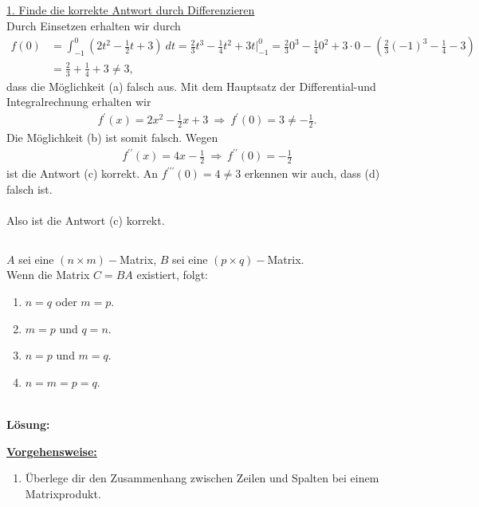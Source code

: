 \underline{1. Finde die korrekte Antwort durch Differenzieren}\\
Durch Einsetzen erhalten wir durch
\begin{align*}
f(0)
&=
\int_{-1}^0 \left( 2 t^2 - \frac{1}{2}t +3 \right) \ dt
=
\frac{2}{3} t^3 - \frac{1}{4} t^2 + 3 t \bigg|_{-1}^0
=
\frac{2}{3} 0^3 - \frac{1}{4} 0^2 + 3 \cdot 0
- (\frac{2}{3} (-1)^3  - \frac{1}{4} - 3 )\\
&=
\frac{2}{3} + \frac{1}{4} + 3  \neq 3,
\end{align*}
dass die Möglichkeit (a) falsch aus. Mit dem Hauptsatz der Differential-und Integralrechnung erhalten wir 
\begin{align*}
f^\prime(x)
 = 2 x^2 - \frac{1}{2} x + 3 
 \ 
  \Rightarrow \
  f^\prime(0)  = 3 \neq -\frac{1}{2}.
\end{align*}
Die Möglichkeit (b) ist somit falsch.
Wegen
\begin{align*}
f^{\prime \prime}(x) = 4 x - \frac{1}{2}
\ \Rightarrow \
f^{\prime \prime}(0) = - \frac{1}{2}
\end{align*}
ist die Antwort (c) korrekt. An $ f^{\prime \prime \prime}(0) = 4 \neq 3 $ erkennen wir auch, dass (d) falsch ist.\\
\\
Also ist die Antwort (c) korrekt.
 \newpage

\subsection*{}
$ A $ sei eine $ (n \times m )- $Matrix, $ B $ sei eine $ (p \times q)- $Matrix.\\
Wenn die Matrix $ C = BA $ existiert, folgt:
\renewcommand{\labelenumi}{(\alph{enumi})}
\begin{enumerate}
	\item 
	$ n= q $ oder $ m = p $.
	\item 
	$ m = p $ und $ q= n $.
	\item
	$ n= p $ und $ m = q $.
	\item
	$ n = m = p = q $.
\end{enumerate}
\ \\
\textbf{Lösung:}
\begin{mdframed}
\underline{\textbf{Vorgehensweise:}}
\renewcommand{\labelenumi}{\theenumi.}
\begin{enumerate}
\item Überlege dir den Zusammenhang zwischen Zeilen und Spalten bei einem Matrixprodukt.
\end{enumerate}
\end{mdframed}

